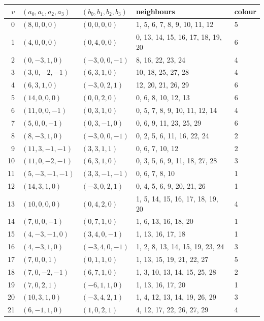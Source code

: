 \documentclass[11pt,a4paper]{amsart}
\theoremstyle{remark}
\begin{document}
{\small
\begin{longtable}{rllll}
\toprule
$v$ & $(a_0,a_1,a_2,a_3)$ & $(b_0,b_1,b_2,b_3)$ & neighbours & colour\\
\midrule
\endhead
0 & $(8, 0, 0, 0)$ & $(0, 0, 0, 0)$ & 1, 5, 6, 7, 8, 9, 10, 11, 12 & 5 \\
1 & $(4, 0, 0, 0)$ & $(0, 4, 0, 0)$ & 0, 13, 14, 15, 16, 17, 18, 19, 20 & 6 \\
2 & $(0, -3, 1, 0)$ & $(-3, 0, 0, -1)$ & 8, 16, 22, 23, 24 & 4 \\
3 & $(3, 0, -2, -1)$ & $(6, 3, 1, 0)$ & 10, 18, 25, 27, 28 & 4 \\
4 & $(6, 3, 1, 0)$ & $(-3, 0, 2, 1)$ & 12, 20, 21, 26, 29 & 6 \\
5 & $(14, 0, 0, 0)$ & $(0, 0, 2, 0)$ & 0, 6, 8, 10, 12, 13 & 6 \\
6 & $(11, 0, 0, -1)$ & $(0, 3, 1, 0)$ & 0, 5, 7, 8, 9, 10, 11, 12, 14 & 4 \\
7 & $(5, 0, 0, -1)$ & $(0, 3, -1, 0)$ & 0, 6, 9, 11, 23, 25, 29 & 6 \\
8 & $(8, -3, 1, 0)$ & $(-3, 0, 0, -1)$ & 0, 2, 5, 6, 11, 16, 22, 24 & 2 \\
9 & $(11, 3, -1, -1)$ & $(3, 3, 1, 1)$ & 0, 6, 7, 10, 12 & 2 \\
10 & $(11, 0, -2, -1)$ & $(6, 3, 1, 0)$ & 0, 3, 5, 6, 9, 11, 18, 27, 28 & 3 \\
11 & $(5, -3, -1, -1)$ & $(3, 3, -1, -1)$ & 0, 6, 7, 8, 10 & 1 \\
12 & $(14, 3, 1, 0)$ & $(-3, 0, 2, 1)$ & 0, 4, 5, 6, 9, 20, 21, 26 & 1 \\
13 & $(10, 0, 0, 0)$ & $(0, 4, 2, 0)$ & 1, 5, 14, 15, 16, 17, 18, 19, 20 & 4 \\
14 & $(7, 0, 0, -1)$ & $(0, 7, 1, 0)$ & 1, 6, 13, 16, 18, 20 & 1 \\
15 & $(4, -3, -1, 0)$ & $(3, 4, 0, -1)$ & 1, 13, 16, 17, 18 & 1 \\
16 & $(4, -3, 1, 0)$ & $(-3, 4, 0, -1)$ & 1, 2, 8, 13, 14, 15, 19, 23, 24 & 3 \\
17 & $(7, 0, 0, 1)$ & $(0, 1, 1, 0)$ & 1, 13, 15, 19, 21, 22, 27 & 5 \\
18 & $(7, 0, -2, -1)$ & $(6, 7, 1, 0)$ & 1, 3, 10, 13, 14, 15, 25, 28 & 2 \\
19 & $(7, 0, 2, 1)$ & $(-6, 1, 1, 0)$ & 1, 13, 16, 17, 20 & 1 \\
20 & $(10, 3, 1, 0)$ & $(-3, 4, 2, 1)$ & 1, 4, 12, 13, 14, 19, 26, 29 & 3 \\
21 & $(6, -1, 1, 0)$ & $(1, 0, 2, 1)$ & 4, 12, 17, 22, 26, 27, 29 & 4 \\

\end{longtable}}
\end{document}
